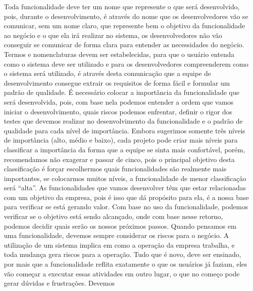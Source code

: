       Toda funcionalidade deve ter um nome que represente o que será desenvolvido,
      pois, durante o desenvolvimento, é através do nome que os desenvolvedores
      vão se comunicar, sem um nome claro, que represente bem o objetivo da
      funcionalidade ao negócio e o que ela irá realizar no sistema, os desenvolvedores
      não vão conseguir se comunicar de forma clara para entender as necessidades
      do negócio. Termos e nomenclaturas devem ser estabelecidas, para que o usuário
      entenda como o sistema deve ser utilizado e para os desenvolvedores compreenderem
      como o sistema será utilizado, é através desta comunicação que a equipe de
      desenvolvimento consegue extrair os requisitos de forma fácil e formular um
      padrão de qualidade. \newline
      É necessário colocar a importância da funcionalidade que será desenvolvida, pois,
      com base nela podemos entender a ordem que vamos iniciar o desenvolvimento,
      quais riscos podemos enfrentar, definir o rigor dos testes que devemos realizar
      no desenvolvimento da funcionalidade e o padrão de qualidade para cada nível
      de importância. Embora sugerimos somente três níveis de importância (alto,
      médio e baixo), cada projeto pode criar mais níveis para classificar a
      importância da forma que a equipe se sinta mais confortável, porém, recomendamos
      não exagerar e passar de cinco, pois o principal objetivo desta classificação
      é forçar escolhermos quais funcionalidades são realmente mais importantes,
      se colocarmos muitos níveis, a funcionalidade de menor classificação será
      “alta”. \newline
      As funcionalidades que vamos desenvolver têm que estar relacionadas com um
      objetivo da empresa, pois é isso que dá propósito para ela, é a nossa base
      para verificar se está gerando valor. Com base no uso da funcionalidade,
      podemos verificar se o objetivo está sendo alcançado, onde com base nesse
      retorno, podemos decidir quais serão os nossos próximos passos. \newline
      Quando pensamos em uma funcionalidade, devemos sempre considerar os riscos
      para o negócio. A utilização de um sistema implica em como a operação da
      empresa trabalha, e toda mudança gera riscos para a operação. Tudo que é
      novo, deve ser ensinado, por mais que a funcionalidade reflita exatamente o
      que os usuários já faziam, eles vão começar a executar essas atividades em
      outro lugar, o que no começo pode gerar dúvidas e frustrações. Devemos

